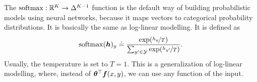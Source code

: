 
The $\mathrm{softmax}: \mathbb{R}^K \to \Delta^{K-1}$ function is the default way of building
probabilistic models using neural networks, because it maps vectors to
categorical probability distributions. It is basically the same as log-linear
modelling. It is defined as \[
  \softmax(\vec{h})_y \doteq \frac{\exp \lft( \nicefrac{h_y}{T} \rgt)}{\sum_{y'\in\mathcal{Y}} \exp \lft( \nicefrac{h_{y'}}{T} \rgt)}
.\]
Usually, the temperature is set to $T=1$. This is a generalization of
log-linear modelling, where, instead of $\bm{\theta}^\top
\bm{f}(x,y)$, we can use any function of the input.
